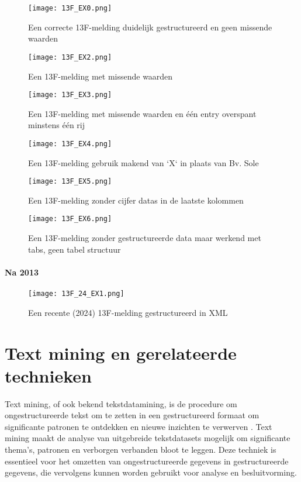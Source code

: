 \begin{figure}[hbt!]
    \texttt{[image: 13F\_EX0.png]}
    \caption[13F voorbeeld 1]{\label{fig:voorbeeld 1}Een correcte 13F-melding duidelijk gestructureerd en geen missende waarden}
\end{figure}


\begin{figure}[hbt!]
    \texttt{[image: 13F\_EX2.png]}
    \caption[13F voorbeeld 3]{\label{fig:voorbeeld 2}Een 13F-melding met missende waarden}
\end{figure}
\begin{figure}[hbt!]
    \texttt{[image: 13F\_EX3.png]}
    \caption[13F voorbeeld 4]{\label{fig:voorbeeld 3}Een 13F-melding met missende waarden en één entry overspant minstens één rij}
\end{figure}

\begin{figure}[hbt!]
    \texttt{[image: 13F\_EX4.png]}
    \caption[13F voorbeeld 5]{\label{fig:voorbeeld 4}Een 13F-melding gebruik makend van `X` in plaats van Bv. Sole}
\end{figure}

\begin{figure}[hbt!]
    \texttt{[image: 13F\_EX5.png]}
    \caption[13F voorbeeld 6]{\label{fig:voorbeeld 5}Een 13F-melding zonder cijfer datas in de laatste kolommen}
\end{figure}

\begin{figure}[hbt!]
    \texttt{[image: 13F\_EX6.png]}
    \caption[13F voorbeeld 7]{\label{fig:voorbeeld 6}Een 13F-melding zonder gestructureerde data maar werkend met tabs, geen tabel structuur}
\end{figure}
\paragraph{Na 2013}

\begin{figure}[hbt!]
    \texttt{[image: 13F\_24\_EX1.png]}
    \caption[13F voorbeeld 7]{\label{fig:voorbeeld 2024 1}Een recente (2024) 13F-melding gestructureerd in XML}
\end{figure}


\section{Text mining en gerelateerde technieken}
Text mining, of ook bekend tekstdatamining, is de procedure om ongestructureerde tekst om te zetten in een gestructureerd formaat om significante patronen te ontdekken en nieuwe inzichten te verwerven \autocite{IBM2024}. Text mining maakt de analyse van uitgebreide tekstdatasets mogelijk om significante thema's, patronen en verborgen verbanden bloot te leggen. Deze techniek is essentieel voor het omzetten van ongestructureerde gegevens in gestructureerde gegevens, die vervolgens kunnen worden gebruikt voor analyse en besluitvorming.

